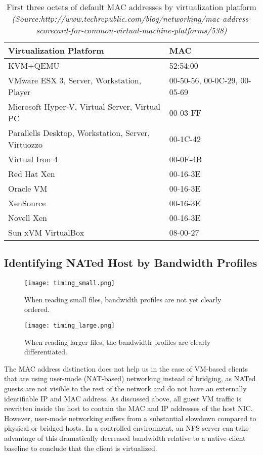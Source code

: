 \documentclass[letterpaper,twocolumn,11pt]{article}
\begin{document}
\begin{table*}[htb]
		\centering
		\begin{tabular}{|l|l|}
		\hline
			Virtualization Platform & MAC \\
		\hline
		\hline
			KVM+QEMU & 52:54:00 \\
			VMware ESX 3, Server, Workstation, Player	& 00-50-56, 00-0C-29, 00-05-69 \\
			Microsoft Hyper-V, Virtual Server, Virtual PC	& 00-03-FF \\
			Parallells Desktop, Workstation, Server, Virtuozzo & 00-1C-42 \\
			Virtual Iron 4 & 00-0F-4B \\
			Red Hat Xen	& 00-16-3E \\
			Oracle VM	& 00-16-3E \\
			XenSource	& 00-16-3E \\
			Novell Xen & 00-16-3E \\
			Sun xVM VirtualBox & 08-00-27 \\
		\hline
		\end{tabular}
	\caption{First three octets of default MAC addresses by virtualization platform \emph{(Source:http://www.techrepublic.com/blog/networking/mac-address-scorecard-for-common-virtual-machine-platforms/538)}}
	\label{tab:macaddrs}
\end{table*}


\subsection{Identifying NATed Host by Bandwidth Profiles}
\label{subsec:BWprofiles}	

\begin{figure}[htb]
		\texttt{[image: timing\_small.png]}
	\caption{When reading small files, bandwidth profiles are not yet clearly ordered.}
	\label{fig:timing_small}
\end{figure}

\begin{figure}[htb]
		\texttt{[image: timing\_large.png]}
	\caption{When reading larger files, the bandwidth profiles are clearly differentiated.}
	\label{fig:timing_large}
\end{figure}

The MAC address distinction does not help us in the case of VM-based clients that are using user-mode (NAT-based) networking instead of bridging, as NATed guests are not visible to the rest of the network and do not have an externally identifiable IP and MAC address. As discussed above, all guest VM traffic is rewritten inside the host to contain the MAC and IP addresses of the host NIC. However, user-mode networking suffers from a substantial slowdown compared to physical or bridged hosts. In a controlled environment, an NFS server can take advantage of this dramatically decreased bandwidth relative to a native-client baseline to conclude that the client is virtualized. 
\end{document}
